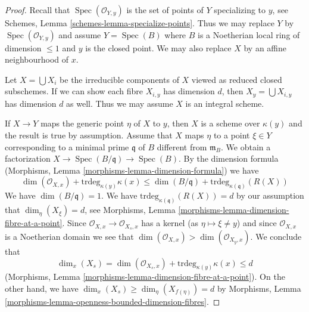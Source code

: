 \documentclass[10pt,a4paper]{amsart}
\theoremstyle{plain}
\theoremstyle{definition}
\theoremstyle{remark}
\numberwithin{equation}{subsection}
\def\Spec{\mathop{\mathrm{Spec}}}
\begin{document}
\begin{proof}
Recall that $\Spec(\mathcal{O}_{Y, y})$
is the set of points of $Y$ specializing to $y$, see
Schemes, Lemma \ref{schemes-lemma-specialize-points}.
Thus we may replace $Y$ by $\Spec(\mathcal{O}_{Y, y})$
and assume $Y = \Spec(B)$ where $B$ is a Noetherian
local ring of dimension $\leq 1$ and $y$ is the closed point.
We may also replace $X$ by an affine neighbourhood of $x$.

\medskip\noindent
Let $X = \bigcup X_i$ be the irreducible components of $X$ viewed
as reduced closed subschemes. If we can show each fibre $X_{i, y}$
has dimension $d$, then $X_y = \bigcup X_{i, y}$ has dimension $d$ as
well. Thus we may assume $X$ is an integral scheme.

\medskip\noindent
If $X \to Y$ maps the generic point $\eta$ of $X$ to $y$, then $X$
is a scheme over $\kappa(y)$ and the result is true by assumption.
Assume that $X$ maps $\eta$ to a point $\xi \in Y$ corresponding
to a minimal prime $\mathfrak q$ of $B$ different from $\mathfrak m_B$.
We obtain a factorization $X \to \Spec(B/\mathfrak q) \to \Spec(B)$.
By the dimension formula
(Morphisms, Lemma \ref{morphisms-lemma-dimension-formula})
we have
$$
\dim(\mathcal{O}_{X, x}) + \text{trdeg}_{\kappa(y)} \kappa(x) \leq
\dim(B/\mathfrak q) + \text{trdeg}_{\kappa(\mathfrak q)}(R(X))
$$
We have $\dim(B/\mathfrak q) = 1$. We have
$\text{trdeg}_{\kappa(\mathfrak q)}(R(X)) = d$ by
our assumption that $\dim_\eta(X_\xi) = d$, see
Morphisms, Lemma \ref{morphisms-lemma-dimension-fibre-at-a-point}.
Since $\mathcal{O}_{X, x} \to \mathcal{O}_{X_s, x}$ has a kernel
(as $\eta \mapsto \xi \not = y$) and since $\mathcal{O}_{X, x}$
is a Noetherian domain we see that
$\dim(\mathcal{O}_{X, x}) > \dim(\mathcal{O}_{X_y, x})$.
We conclude that
$$
\dim_x(X_s) =
\dim(\mathcal{O}_{X_s, x}) + \text{trdeg}_{\kappa(y)} \kappa(x) \leq d
$$
(Morphisms, Lemma \ref{morphisms-lemma-dimension-fibre-at-a-point}).
On the other hand, we have
$\dim_x(X_s) \geq \dim_\eta(X_{f(\eta)}) = d$ by
Morphisms, Lemma \ref{morphisms-lemma-openness-bounded-dimension-fibres}.
\end{proof}
\end{document}
